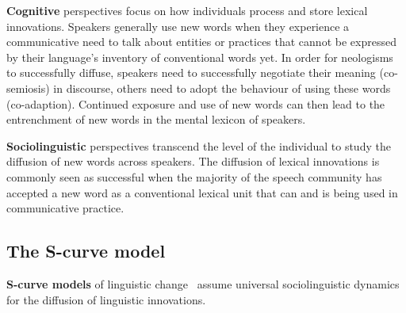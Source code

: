 \documentclass[draft, a4paper, abstract=on]{scrartcl}
\renewcommand{\hw}[1]{\textbf{#1}}
\begin{document}
  \hw{Cognitive} perspectives focus on how individuals process and store lexical innovations. Speakers generally use new words when they experience a communicative need to talk about entities or practices that cannot be expressed by their language's inventory of conventional words yet. In order for neologisms to successfully diffuse, speakers need to successfully negotiate their meaning (co-semiosis) in discourse, others need to adopt the behaviour of using these words (co-adaption). Continued exposure and use of new words can then lead to the entrenchment of new words in the mental lexicon of speakers.~\parencite{Schmid2008NewWords}

  \hw{Sociolinguistic} perspectives transcend the level of the individual to study the diffusion of new words across speakers. The diffusion of lexical innovations is commonly seen as successful when the majority of the speech community has accepted a new word as a conventional lexical unit that can and is being used in communicative practice.


  \subsection{The S-curve model}

  \hw{S-curve models} of linguistic change~\parencite{Milroy1992LinguisticVariation, Nevalainen2015DescriptiveAdequacy, Labov2007TransmissionDiffusion} assume universal sociolinguistic dynamics for the diffusion of linguistic innovations.
\end{document}
